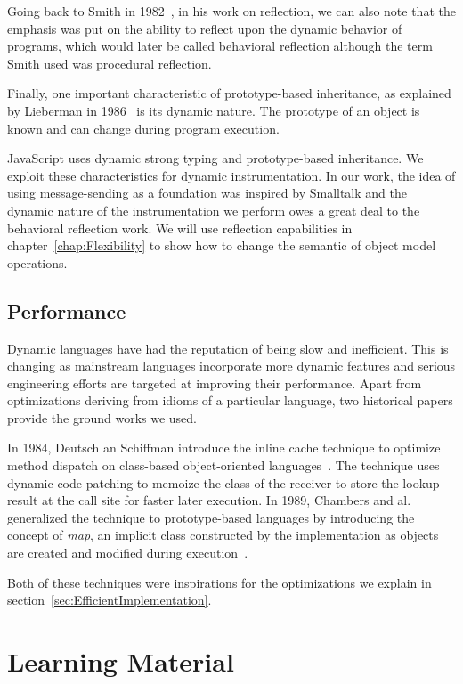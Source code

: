 Going back to Smith in 1982~\cite{Smith:1982}, in his work on reflection, we
can also note that the emphasis was put on the ability to reflect upon the
dynamic behavior of programs, which would later be called behavioral reflection
although the term Smith used was procedural reflection.

Finally, one important characteristic of prototype-based inheritance, as
explained by Lieberman in 1986~\cite{Lieberman:1986} is its dynamic nature. The
prototype of an object is known and can change during program execution.

JavaScript uses dynamic strong typing and prototype-based inheritance.  We
exploit these characteristics for dynamic instrumentation. In our work, the
idea of using message-sending as a foundation was inspired by Smalltalk  and
the dynamic nature of the instrumentation we perform owes a great deal to the
behavioral reflection work. We will use reflection capabilities in
chapter~\ref{chap:Flexibility} to show how to change the semantic of object
model operations.

\subsection{Performance}

Dynamic languages have had the reputation of being slow and inefficient. This
is changing as mainstream languages incorporate more dynamic features and
serious engineering efforts are targeted at improving their performance. Apart
from optimizations deriving from idioms of a particular language, two historical
papers provide the ground works we used.

In 1984, Deutsch an Schiffman introduce the inline cache technique to optimize
method dispatch on class-based object-oriented languages~\cite{Deutsch:1984}.
The technique uses dynamic code patching to memoize the class of the receiver
to store the lookup result at the call site for faster later execution. In
1989, Chambers and al. generalized the technique to prototype-based languages
by introducing the concept of \textit{map}, an implicit class constructed by
the implementation as objects are created and modified during
execution~\cite{self}.

Both of these techniques were inspirations for the optimizations we explain in
section~\ref{sec:EfficientImplementation}.

\section{Learning Material}

